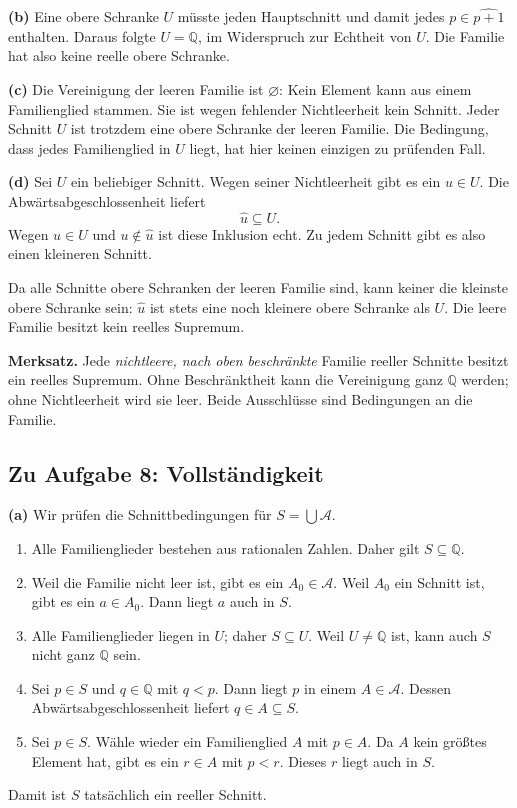 \textbf{(b)} Eine obere Schranke $U$ müsste jeden Hauptschnitt
und damit jedes $p\in\widehat{p+1}$ enthalten.
Daraus folgte $U=\mathbb Q$, im Widerspruch zur Echtheit von $U$.
Die Familie hat also keine reelle obere Schranke.

\textbf{(c)} Die Vereinigung der leeren Familie ist $\varnothing$:
Kein Element kann aus einem Familienglied stammen.
Sie ist wegen fehlender Nichtleerheit kein Schnitt.
Jeder Schnitt $U$ ist trotzdem eine obere Schranke der leeren
Familie. Die Bedingung, dass jedes Familienglied in $U$ liegt,
hat hier keinen einzigen zu prüfenden Fall.

\textbf{(d)} Sei $U$ ein beliebiger Schnitt.
Wegen seiner Nichtleerheit gibt es ein $u\in U$.
Die Abwärtsabgeschlossenheit liefert
\[
 \widehat u\subseteq U.
\]
Wegen $u\in U$ und $u\notin\widehat u$ ist diese Inklusion echt.
Zu jedem Schnitt gibt es also einen kleineren Schnitt.

Da alle Schnitte obere Schranken der leeren Familie sind,
kann keiner die kleinste obere Schranke sein:
$\widehat u$ ist stets eine noch kleinere obere Schranke als $U$.
Die leere Familie besitzt kein reelles Supremum.

\textbf{Merksatz.} Jede \emph{nichtleere, nach oben beschränkte}
Familie reeller Schnitte besitzt ein reelles Supremum.
Ohne Beschränktheit kann die Vereinigung ganz $\mathbb Q$ werden;
ohne Nichtleerheit wird sie leer.
Beide Ausschlüsse sind Bedingungen an die Familie.

\clearpage
\subsection*{Zu Aufgabe 8: Vollständigkeit}
\textbf{(a)} Wir prüfen die Schnittbedingungen für
$S=\bigcup\mathcal A$.
\begin{enumerate}[label=\arabic*.]
 \item Alle Familienglieder bestehen aus rationalen Zahlen.
 Daher gilt $S\subseteq\mathbb Q$.
 \item Weil die Familie nicht leer ist, gibt es ein
 $A_0\in\mathcal A$. Weil $A_0$ ein Schnitt ist,
 gibt es ein $a\in A_0$. Dann liegt $a$ auch in $S$.
 \item Alle Familienglieder liegen in $U$; daher $S\subseteq U$.
 Weil $U\ne\mathbb Q$ ist, kann auch $S$ nicht ganz $\mathbb Q$ sein.
 \item Sei $p\in S$ und $q\in\mathbb Q$ mit $q<p$.
 Dann liegt $p$ in einem $A\in\mathcal A$.
 Dessen Abwärtsabgeschlossenheit liefert $q\in A\subseteq S$.
 \item Sei $p\in S$. Wähle wieder ein Familienglied $A$ mit
 $p\in A$. Da $A$ kein größtes Element hat, gibt es
 ein $r\in A$ mit $p<r$. Dieses $r$ liegt auch in $S$.
\end{enumerate}
Damit ist $S$ tatsächlich ein reeller Schnitt.

